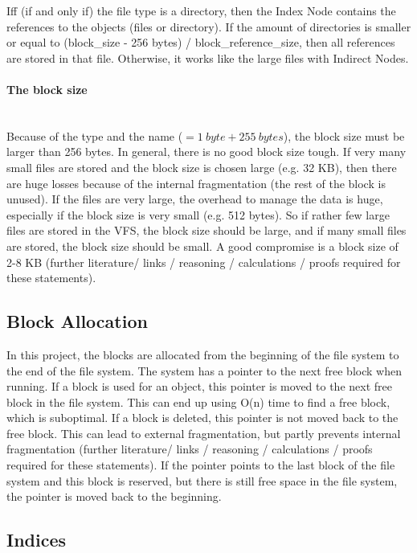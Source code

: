 \documentclass[a4paper,12pt]{article}
\begin{document}
Iff (if and only if) the file type is a directory, then the Index Node contains the references to the objects (files or directory). If the amount of directories is smaller or equal to (block\_size - 256 bytes) / block\_reference\_size, 
then all references are stored in that file. Otherwise, it works like the large files with Indirect Nodes.

\paragraph{The block size} ~\\

\noindent Because of the type and the name ($ = 1\ byte + 255\ bytes$), the block size must be larger than 256 bytes. In general, there is no good block size tough. If very many small files are stored and the block size is chosen  large (e.g. 32 KB), then there are huge losses because of the internal fragmentation (the rest of the block is unused). If the files are very large, the overhead to manage the data is huge, especially if the block size is very small (e.g. 512 bytes). So if rather few large files are stored in the VFS, the block size should be large, and if many small files are stored, the block size should be small. A good compromise is a block size of 2-8 KB (further literature/ links / reasoning / calculations / proofs required for these statements).

\subsection{Block Allocation}

In this project, the blocks are allocated from the beginning of the file system to the end of the file system. The system has a pointer to the next free block when running. If a block is used for an object, this pointer is moved to the next free block in the file system. This can end up using O(n) time to find a free block, which is suboptimal. If a block is deleted, this pointer is not moved back to the free block. This can lead to external fragmentation, but partly prevents internal fragmentation (further literature/ links / reasoning / calculations / proofs required for these statements). If the pointer points to the last block of the file system and this block is reserved, but there is still free space in the file system, the pointer is moved back to the beginning.

\subsection{Indices}
\end{document}
